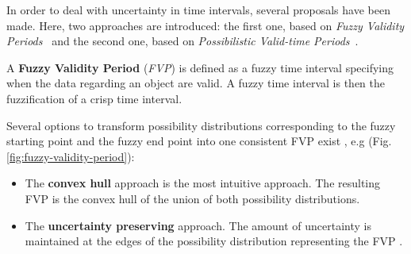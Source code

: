 In order to deal with uncertainty in time intervals, several proposals have been made. Here, two approaches are introduced: the first one, based on \emph{Fuzzy Validity Periods}~\cite{Garrido2009} and the second one, based on \emph{Possibilistic Valid-time Periods}~\cite{JoseEnriquePons2012}.

\begin{definition}
A \textbf{Fuzzy Validity Period} (\emph{FVP}) is defined as a fuzzy time interval specifying when the data regarding an object are valid. A fuzzy time interval is then the fuzzification of a crisp time interval.\\
\end{definition}


Several options to transform possibility distributions corresponding to the fuzzy starting point and the fuzzy end point into one consistent FVP exist \cite{Garrido2009}, e.g (Fig. \ref{fig:fuzzy-validity-period}):
\begin{itemize}
\item The \textbf{convex hull} approach is the most intuitive approach. The resulting FVP is the convex hull of the union of both possibility distributions.
\item The \textbf{uncertainty preserving} approach. The amount of uncertainty is maintained at the edges of the possibility distribution representing the FVP \cite{Garrido2009}.
\end{itemize}

